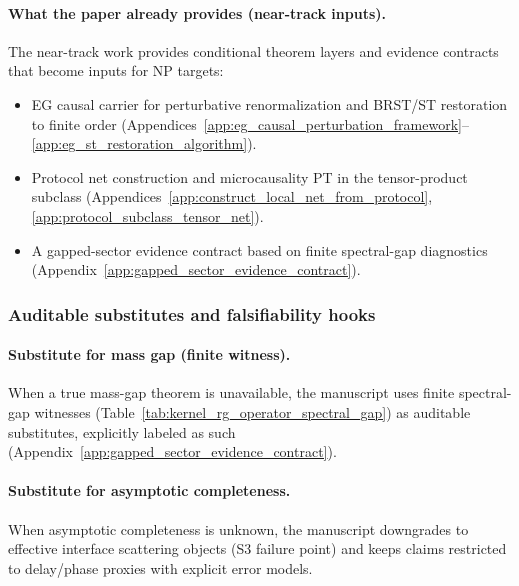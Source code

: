 \paragraph{What the paper already provides (near-track inputs).}
\AuditTag The near-track work provides conditional theorem layers and evidence contracts that become inputs for NP targets:
\begin{itemize}
\item EG causal carrier for perturbative renormalization and BRST/ST restoration to finite order (Appendices~\ref{app:eg_causal_perturbation_framework}--\ref{app:eg_st_restoration_algorithm}).
\item Protocol net construction and microcausality PT in the tensor-product subclass (Appendices~\ref{app:construct_local_net_from_protocol}, \ref{app:protocol_subclass_tensor_net}).
\item A gapped-sector evidence contract based on finite spectral-gap diagnostics (Appendix~\ref{app:gapped_sector_evidence_contract}).
\end{itemize}

\subsubsection{Auditable substitutes and falsifiability hooks}
\paragraph{Substitute for mass gap (finite witness).}
\AuditTag When a true mass-gap theorem is unavailable, the manuscript uses finite spectral-gap witnesses (Table~\ref{tab:kernel_rg_operator_spectral_gap}) as auditable substitutes, explicitly labeled as such (Appendix~\ref{app:gapped_sector_evidence_contract}).

\paragraph{Substitute for asymptotic completeness.}
\AuditTag When asymptotic completeness is unknown, the manuscript downgrades to effective interface scattering objects (S3 failure point) and keeps claims restricted to delay/phase proxies with explicit error models.

